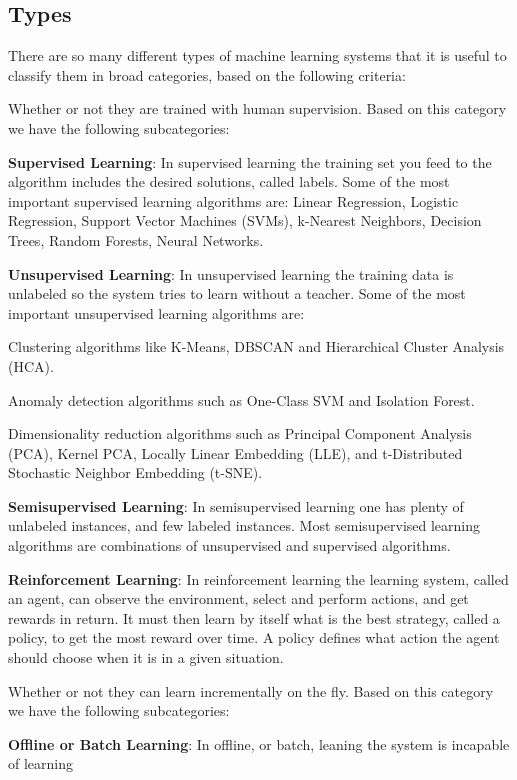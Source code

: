 \subsection{Types}

There are so many different types of machine learning systems that it is useful to classify them in broad categories,
based on the following criteria:
\ben
\item Whether or not they are trained with human supervision. Based on this category we have the following
subcategories:
\bit
\item \textbf{Supervised Learning}: In supervised learning the training set you feed to the algorithm includes the
desired solutions, called labels. Some of the most important supervised learning algorithms are: Linear Regression,
Logistic Regression, Support Vector Machines (SVMs), k-Nearest Neighbors, Decision Trees, Random Forests, Neural
Networks.
\item \textbf{Unsupervised Learning}: In unsupervised learning the training data is unlabeled so the system tries to
learn without a teacher. Some of the most important unsupervised learning algorithms are:
\bit
\item Clustering algorithms like K-Means, DBSCAN and Hierarchical Cluster Analysis (HCA).
\item Anomaly detection algorithms such as One-Class SVM and Isolation Forest.
\item Dimensionality reduction algorithms such as Principal Component Analysis (PCA), Kernel PCA, Locally Linear
Embedding (LLE), and t-Distributed Stochastic Neighbor Embedding (t-SNE).
\eit
\item \textbf{Semisupervised Learning}: In semisupervised learning one has plenty of unlabeled instances, and few
labeled instances. Most semisupervised learning algorithms are combinations of unsupervised and supervised algorithms.
\item \textbf{Reinforcement Learning}: In reinforcement learning the learning system, called an agent, can observe
the environment, select and perform actions, and get rewards in return. It must then learn by itself what is the
best strategy, called a policy, to get the most reward over time. A policy defines what action the agent should
choose when it is in a given situation.
\eit
\item Whether or not they can learn incrementally on the fly. Based on this category we have the following
subcategories:
\bit
\item \textbf{Offline or Batch Learning}: In offline, or batch, leaning the system is incapable of learning
